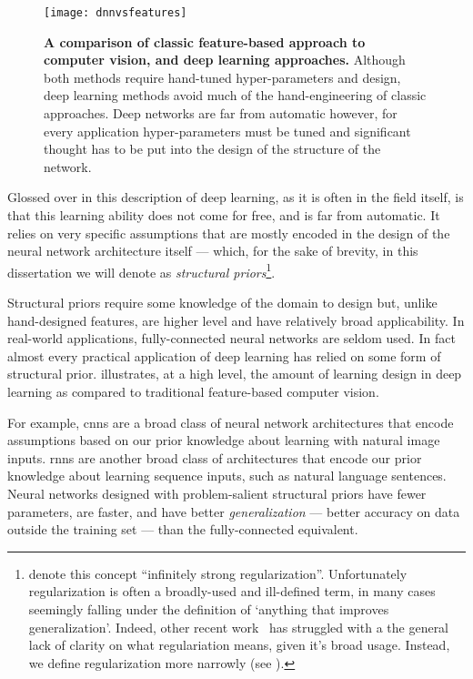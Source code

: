 \documentclass[thesis]{subfiles}
\begin{document}
\begin{figure}[tbp]
	\centering
	\texttt{[image: dnnvsfeatures]}
	\caption[Classic feature-based approach \vs{} deep learning]{\textbf{A comparison of classic feature-based approach to computer vision, and deep learning approaches.} Although both methods require hand-tuned hyper-parameters and design, deep learning methods avoid much of the hand-engineering of classic approaches. Deep networks are far from automatic however, for every application hyper-parameters must be tuned and significant thought has to be put into the design of the structure of the network.}\label{dnnvsfeatures}
\end{figure}
	
Glossed over in this description of deep learning, as it is often in the field itself, is that this learning ability does not come for free, and is far from automatic. It relies on very specific assumptions that are mostly encoded in the design of the neural network architecture itself --- which, for the sake of brevity, in this dissertation we will denote as \emph{structural priors}\footnote{\citet{goodfellow2016deep} denote this concept ``infinitely strong regularization''. Unfortunately regularization is often a broadly-used and ill-defined term, in many cases seemingly falling under the definition of `anything that improves generalization'. Indeed, other recent work~\citep{rethinking2016} has struggled with a the general lack of clarity on what regulariation means, given it's broad usage. Instead, we define \gls{regularization} more narrowly (see ). }.

Structural priors require some knowledge of the domain to design but, unlike hand-designed features, are higher level and have relatively broad applicability. In real-world applications, fully-connected neural networks are seldom used. In fact almost every practical application of deep learning has relied on some form of structural prior.  illustrates, at a high level, the amount of learning \vs design in deep learning as compared to traditional feature-based computer vision.

For example, \glspl{cnn} are a broad class of neural network architectures that encode assumptions based on our prior knowledge about learning with natural image inputs. \Glspl{rnn} are another broad class of architectures that encode our prior knowledge about learning sequence inputs, such as natural language sentences. Neural networks designed with problem-salient structural priors have fewer parameters, are faster, and have better \emph{generalization} --- better accuracy on data outside the training set --- than the fully-connected equivalent.
\end{document}
